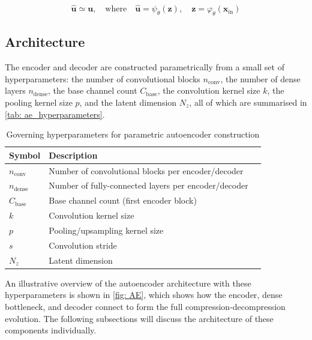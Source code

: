 \begin{equation}\label{eq: AE_goal}
    \hat{\mathbf{u}} \simeq \mathbf{u}, \quad \text{where} \quad 
    \hat{\mathbf{u}} = \psi_\theta(\mathbf{z}), \quad 
    \mathbf{z} = \varphi_\theta(\mathbf{x}_\text{in})
\end{equation}


\subsection{Architecture}
\label{sect: AEarch}

The encoder and decoder are constructed parametrically from a small set of hyperparameters: the number of convolutional blocks $n_\text{conv}$, the number of dense layers $n_\text{dense}$, the base channel count $C_\text{base}$, the convolution kernel size $k$, the pooling kernel size $p$, and the latent dimension $N_z$, all of which are summarised in \autoref{tab: ae_hyperparameters}.

\begin{table}[H]
    \centering
    \begin{tabular}{@{}llc@{}}
        \toprule
        Symbol & Description  \\
        \midrule
        $n_\text{conv}$    & Number of convolutional blocks per encoder/decoder    \\
        $n_\text{dense}$   & Number of fully-connected layers per encoder/decoder  \\
        $C_\text{base}$    & Base channel count (first encoder block)              \\
        $k$                & Convolution kernel size                               \\
        $p$                & Pooling/upsampling kernel size                        \\
        $s$                & Convolution stride                                    \\
        $N_z$              & Latent dimension                                      \\
        \bottomrule
    \end{tabular}
    \caption{Governing hyperparameters for parametric autoencoder construction}
    \label{tab: ae_hyperparameters}
\end{table}


An illustrative overview of the autoencoder architecture with these hyperparameters is shown in \autoref{fig: AE}, which shows how the encoder, dense bottleneck, and decoder connect to form the full compression-decompression evolution. The following subsections will discuss the architecture of these components individually. 


